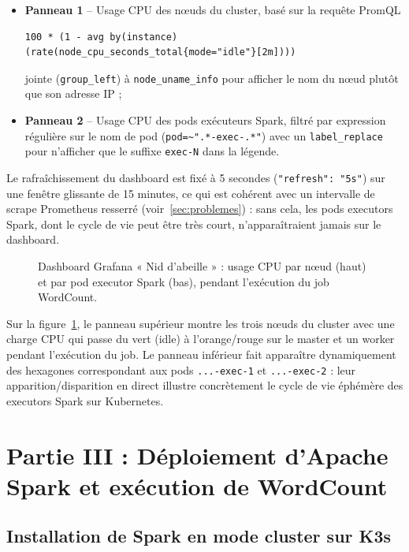 \documentclass{name}
\begin{document}
\begin{itemize}
    \item \textbf{Panneau 1} -- Usage CPU des nœuds du cluster, basé sur la requête PromQL
    \begin{lstlisting}[basicstyle=\ttfamily\small]
100 * (1 - avg by(instance)(rate(node_cpu_seconds_total{mode="idle"}[2m])))
\end{lstlisting}
    jointe (\texttt{group\_left}) à \texttt{node\_uname\_info} pour afficher le nom du nœud plutôt que son adresse IP ;
    \item \textbf{Panneau 2} -- Usage CPU des pods exécuteurs Spark, filtré par expression régulière sur le nom de pod (\texttt{pod=\textasciitilde".*-exec-.*"}) avec un \texttt{label\_replace} pour n'afficher que le suffixe \texttt{exec-N} dans la légende.
\end{itemize}

Le rafraîchissement du dashboard est fixé à 5 secondes (\texttt{"refresh": "5s"}) sur une fenêtre glissante de 15 minutes, ce qui est cohérent avec un intervalle de scrape Prometheus resserré (voir~\ref{sec:problemes}) : sans cela, les pods executors Spark, dont le cycle de vie peut être très court, n'apparaîtraient jamais sur le dashboard.

\begin{figure}[H]
    \centering
    \fbox{\rule{0.9\textwidth}{0pt}\rule{0pt}{6cm}}
    \caption{Dashboard Grafana « Nid d'abeille » : usage CPU par nœud (haut) et par pod executor Spark (bas), pendant l'exécution du job WordCount.}
    \label{fig:honeycomb}
\end{figure}

Sur la figure~\ref{fig:honeycomb}, le panneau supérieur montre les trois nœuds du cluster avec une charge CPU qui passe du vert (idle) à l'orange/rouge sur le master et un worker pendant l'exécution du job. Le panneau inférieur fait apparaître dynamiquement des hexagones correspondant aux pods \texttt{...-exec-1} et \texttt{...-exec-2} : leur apparition/disparition en direct illustre concrètement le cycle de vie éphémère des executors Spark sur Kubernetes.

\section{Partie III : Déploiement d'Apache Spark et exécution de WordCount}

\subsection{Installation de Spark en mode cluster sur K3s}
\end{document}
